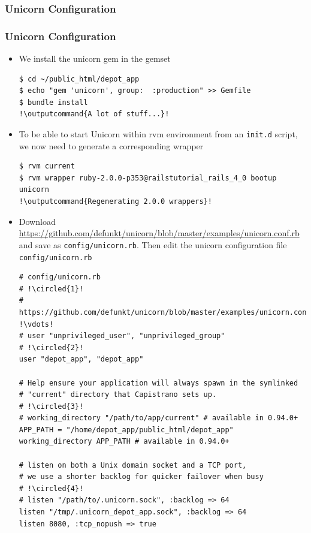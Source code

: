 \documentclass{beamer}
\newcommand*\circled[1]{\tikz[baseline=(char.base)]{
            \node[shape=circle,draw,inner sep=2pt] (char) {#1};}}
\newcommand{\outputcommand}[1]{\color{darkgreen}{#1}}
\begin{document}
\subsubsection{Unicorn Configuration}
\begin{frame}
\frametitle{Unicorn Configuration}

\begin{itemize}
\item  We install the unicorn gem in the gemset

\lstset{language=shell, escapechar=!}
\begin{lstlisting}[escapechar=!]
$ cd ~/public_html/depot_app
$ echo "gem 'unicorn', group:  :production" >> Gemfile
$ bundle install
!\outputcommand{A lot of stuff...}!
\end{lstlisting}

\item To be able to start Unicorn within \acrshort{rvm} environment from an \texttt{init.d} script, we now need to generate a corresponding wrapper

\lstset{language=shell, escapechar=!}
\begin{lstlisting}[escapechar=!]
$ rvm current
$ rvm wrapper ruby-2.0.0-p353@railstutorial_rails_4_0 bootup unicorn
!\outputcommand{Regenerating 2.0.0 wrappers}!
\end{lstlisting}

\item Download \href{https://github.com/defunkt/unicorn/blob/master/examples/unicorn.conf.rb}{https://github.com/defunkt/unicorn/blob/master/examples/unicorn.conf.rb}
and save as \texttt{config/unicorn.rb}. Then edit the unicorn configuration file \texttt{config/unicorn.rb}

\lstset{language=shell, numbers=left}
\begin{lstlisting}[escapechar=!]
# config/unicorn.rb
# !\circled{1}!
# https://github.com/defunkt/unicorn/blob/master/examples/unicorn.conf.rb
!\vdots!
# user "unprivileged_user", "unprivileged_group"
# !\circled{2}!
user "depot_app", "depot_app"

# Help ensure your application will always spawn in the symlinked
# "current" directory that Capistrano sets up.
# !\circled{3}!
# working_directory "/path/to/app/current" # available in 0.94.0+
APP_PATH = "/home/depot_app/public_html/depot_app"
working_directory APP_PATH # available in 0.94.0+

# listen on both a Unix domain socket and a TCP port,
# we use a shorter backlog for quicker failover when busy
# !\circled{4}!
# listen "/path/to/.unicorn.sock", :backlog => 64
listen "/tmp/.unicorn_depot_app.sock", :backlog => 64
listen 8080, :tcp_nopush => true


\end{lstlisting}
\end{itemize}
\end{frame}
\end{document}
